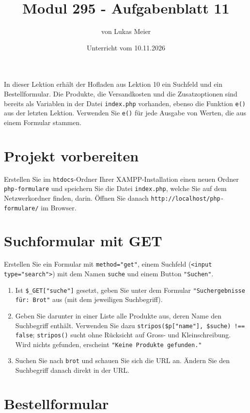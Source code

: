 \documentclass[a4paper,12pt]{article}
\title{Modul 295 - Aufgabenblatt 11}
\author{von Lukas Meier}
\date{Unterricht vom 10.11.2026}
\begin{document}
\maketitle

In dieser Lektion erhält der Hofladen aus Lektion 10 ein Suchfeld und ein Bestellformular. Die Produkte, die Versandkosten und die Zusatzoptionen sind bereits als Variablen in der Datei \texttt{index.php} vorhanden, ebenso die Funktion \texttt{e()} aus der letzten Lektion. Verwenden Sie \texttt{e()} für jede Ausgabe von Werten, die aus einem Formular stammen.

\section{Projekt vorbereiten}

Erstellen Sie im \texttt{htdocs}-Ordner Ihrer XAMPP-Installation einen neuen Ordner \texttt{php-formulare} und speichern Sie die Datei \texttt{index.php}, welche Sie auf dem Netzwerkordner finden, darin. Öffnen Sie danach \texttt{http://localhost/php-formulare/} im Browser.

\section{Suchformular mit GET}

Erstellen Sie ein Formular mit \texttt{method="{}get"{}}, einem Suchfeld (\texttt{<input type="{}search"{}>}) mit dem Namen \texttt{suche} und einem Button \texttt{"{}Suchen"{}}.

\begin{enumerate}
    \item Ist \texttt{\$\_GET["{}suche"{}]} gesetzt, geben Sie unter dem Formular \texttt{"{}Suchergebnisse für: Brot"{}} aus (mit dem jeweiligen Suchbegriff).
    \item Geben Sie darunter in einer Liste alle Produkte aus, deren Name den Suchbegriff enthält. Verwenden Sie dazu \texttt{stripos(\$p["{}name"{}], \$suche) !== false}; \texttt{stripos()} sucht ohne Rücksicht auf Gross- und Kleinschreibung. Wird nichts gefunden, erscheint \texttt{"{}Keine Produkte gefunden."{}}
    \item Suchen Sie nach \texttt{brot} und schauen Sie sich die URL an. Ändern Sie den Suchbegriff danach direkt in der URL.
\end{enumerate}

\section{Bestellformular}
\end{document}
